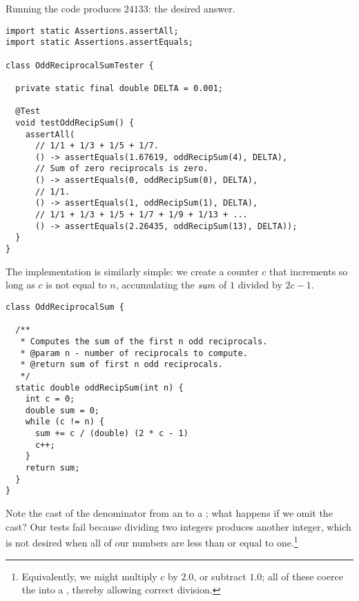Running the code produces $24133$: the desired answer.



\begin{lstlisting}[language=MyJava]
import static Assertions.assertAll;
import static Assertions.assertEquals;

class OddReciprocalSumTester {

  private static final double DELTA = 0.001;

  @Test
  void testOddRecipSum() {
    assertAll(
      // 1/1 + 1/3 + 1/5 + 1/7.
      () -> assertEquals(1.67619, oddRecipSum(4), DELTA),
      // Sum of zero reciprocals is zero.
      () -> assertEquals(0, oddRecipSum(0), DELTA),
      // 1/1.
      () -> assertEquals(1, oddRecipSum(1), DELTA),
      // 1/1 + 1/3 + 1/5 + 1/7 + 1/9 + 1/13 + ...
      () -> assertEquals(2.26435, oddRecipSum(13), DELTA));
  }
}
\end{lstlisting}

The implementation is similarly simple: we create a counter $c$ that increments so long as $c$ is not equal to $n$, accumulating the $\emph{sum}$ of $1$ divided by $2c-1$.

\begin{lstlisting}[language=MyJava]
class OddReciprocalSum {

  /**
   * Computes the sum of the first n odd reciprocals.
   * @param n - number of reciprocals to compute.
   * @return sum of first n odd reciprocals.
   */
  static double oddRecipSum(int n) {
    int c = 0;
    double sum = 0;
    while (c != n) {
      sum += c / (double) (2 * c - 1)
      c++;
    }
    return sum;
  }
}
\end{lstlisting}

Note the cast of the denominator from an  to a ; what happens if we omit the cast? Our tests fail because dividing two integers produces another integer, which is not desired when all of our numbers are less than or equal to one.\footnote{Equivalently, we might multiply $c$ by $2.0$, or subtract $1.0$; all of these coerce the  into a , thereby allowing correct division.}

